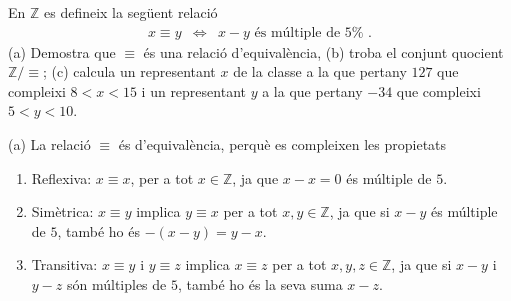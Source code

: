 \begin{exercici}
En $\mathbb{Z}$ es defineix la seg\"{u}ent relaci\'{o}%
\begin{equation*}
\begin{array}{ccc}
x\equiv y & \Longleftrightarrow & x-y\text{ \ \'{e}s m\'{u}ltiple de }5\text{%
.}%
\end{array}%
\end{equation*}%
(a) Demostra que $\equiv $ \'{e}s una relaci\'{o} d'equival\`{e}ncia, (b)
troba el conjunt quocient $\mathbb{Z}/\equiv $; (c) calcula un representant $%
x$ de la classe a la que pertany $127$ que compleixi $8<x<15$ i un
representant $y$ a la que pertany $-34$ que compleixi $5<y<10$.
\end{exercici}

\begin{solucio}
(a) La relaci\'{o} $\equiv $ \'{e}s d'equival\`{e}ncia, perqu\`{e} es
compleixen les propietats

\begin{enumerate}
\item Reflexiva: $x\equiv x$, per a tot $x\in \mathbb{Z}$, ja que $x-x=0$
\'{e}s m\'{u}ltiple de $5$.

\item Sim\`{e}trica: $x\equiv y$ implica $y\equiv x$ per a tot $x,y\in
\mathbb{Z}$, ja que si $x-y$ \'{e}s m\'{u}ltiple de $5$, tamb\'{e} ho \'{e}s
$-(x-y)=y-x$.

\item Transitiva: $x\equiv y$ i $y\equiv z$ implica $x\equiv z$ per a tot $%
x,y,z\in \mathbb{Z}$, ja que si $x-y$ i $y-z$ s\'{o}n m\'{u}ltiples de $5$,
tamb\'{e} ho \'{e}s la seva suma $x-z$.
\end{enumerate}


\end{solucio}

